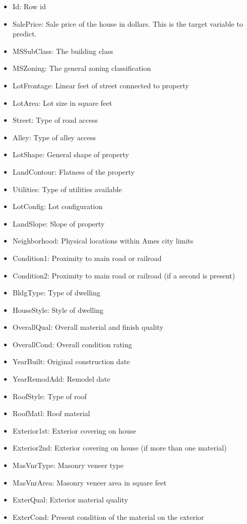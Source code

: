 \documentclass[sigconf]{acmart}
\begin{document}
	\begin{itemize}
		\item Id: Row id
		\item SalePrice: Sale price of the house in dollars. This is the target variable to predict.
		\item MSSubClass: The building class
		\item MSZoning: The general zoning classification
		\item LotFrontage: Linear feet of street connected to property
		\item LotArea: Lot size in square feet
		\item Street: Type of road access
		\item Alley: Type of alley access
		\item LotShape: General shape of property
		\item LandContour: Flatness of the property
		\item Utilities: Type of utilities available
		\item LotConfig: Lot configuration
		\item LandSlope: Slope of property
		\item Neighborhood: Physical locations within Ames city limits
		\item Condition1: Proximity to main road or railroad
		\item Condition2: Proximity to main road or railroad (if a second is present)
		\item BldgType: Type of dwelling
		\item HouseStyle: Style of dwelling
		\item OverallQual: Overall material and finish quality
		\item OverallCond: Overall condition rating
		\item YearBuilt: Original construction date
		\item YearRemodAdd: Remodel date
		\item RoofStyle: Type of roof
		\item RoofMatl: Roof material
		\item Exterior1st: Exterior covering on house
		\item Exterior2nd: Exterior covering on house (if more than one material)
		\item MasVnrType: Masonry veneer type
		\item MasVnrArea: Masonry veneer area in square feet
		\item ExterQual: Exterior material quality
		\item ExterCond: Present condition of the material on the exterior

\end{itemize}
\end{document}
